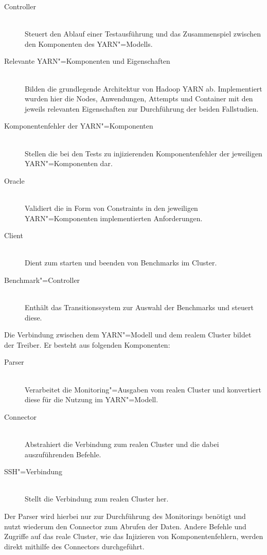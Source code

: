 \begin{description}
    \item [Controller] \hfill \\
        Steuert den Ablauf einer Testausführung und das Zusammenspiel zwischen den Komponenten des YARN"=Modells.
    \item [Relevante YARN"=Komponenten und Eigenschaften] \hfill \\
        Bilden die grundlegende Architektur von Hadoop YARN ab.
        Implementiert wurden hier die Nodes, Anwendungen, Attempts und Container mit den jeweils relevanten Eigenschaften zur Durchführung der beiden Fallstudien.
    \item [Komponentenfehler der YARN"=Komponenten] \hfill \\
        Stellen die bei den Tests zu injizierenden Komponentenfehler der jeweiligen YARN"=Komponenten dar.
    \item [Oracle] \hfill \\
        Validiert die in Form von Constraints in den jeweiligen YARN"=Komponenten implementierten Anforderungen.
    \item [Client] \hfill \\
        Dient zum starten und beenden von Benchmarks im Cluster.
    \item [Benchmark"=Controller] \hfill \\
        Enthält das Transitionssystem zur Auswahl der Benchmarks und steuert diese.
\end{description}

Die Verbindung zwischen dem YARN"=Modell und dem realem Cluster bildet der Treiber.
Er besteht aus folgenden Komponenten:

\begin{description}
    \item [Parser] \hfill \\
        Verarbeitet die Monitoring"=Ausgaben vom realen Cluster und konvertiert diese für die Nutzung im YARN"=Modell.
    \item [Connector] \hfill \\
        Abstrahiert die Verbindung zum realen Cluster und die dabei auszuführenden Befehle.
    \item [SSH"=Verbindung]  \hfill \\
        Stellt die Verbindung zum realen Cluster her.
\end{description}

Der Parser wird hierbei nur zur Durchführung des Monitorings benötigt und nutzt wiederum den Connector zum Abrufen der Daten.
Andere Befehle und Zugriffe auf das reale Cluster, wie \zB das Injizieren von Komponentenfehlern, werden direkt mithilfe des Connectors durchgeführt.

